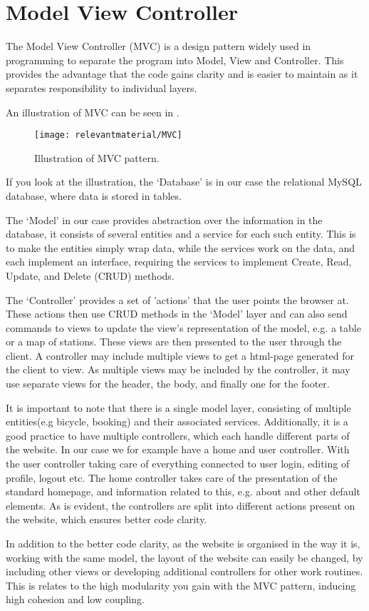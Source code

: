 \section{Model View Controller}
The Model View Controller (MVC) is a design pattern widely used in programming to separate the program into Model, View and Controller. This provides the advantage that the code gains clarity and is easier to maintain as it separates responsibility to individual layers.

An illustration of MVC can be seen in .
\begin{figure}[h]
	\centering
	\texttt{[image: relevantmaterial/MVC]}
	\caption{Illustration of MVC pattern.}\label{fig:MVC}
\end{figure}

If you look at the illustration, the `Database' is in our case the relational MySQL database, where data is stored in tables.

The `Model' in our case provides abstraction over the information in the database, it consists of several entities and a service for each such entity.
This is to make the entities simply wrap data, while the services work on the data, and each implement an interface, requiring the services to implement Create, Read, Update, and Delete (CRUD) methods.

The `Controller' provides a set of 'actions' that the user points the browser at. These actions then use CRUD methods in the `Model' layer and can also send commands to views to update the view's representation of the model, e.g. a table or a map of stations. These views are then presented to the user through the client.
A controller may include multiple views to get a html-page generated for the client to view.
As multiple views may be included by the controller, it may use separate views for the header, the body, and finally one for the footer.

It is important to note that there is a single model layer, consisting of multiple entities(e.g bicycle, booking) and their associated services.
Additionally, it is a good practice to have multiple controllers, which each handle different parts of the website.
In our case we for example have a home and user controller.
With the user controller taking care of everything connected to user login, editing of profile, logout etc.
The home controller takes care of the presentation of the standard homepage, and information related to this, e.g. about and other default elements.
As is evident, the controllers are split into different actions present on the website, which ensures better code clarity.

In addition to the better code clarity, as the website is organised in the way it is, working with the same model, the layout of the website can easily be changed, by including other views or developing additional controllers for other work routines.
This is relates to the high modularity you gain with the MVC pattern, inducing high cohesion and low coupling.